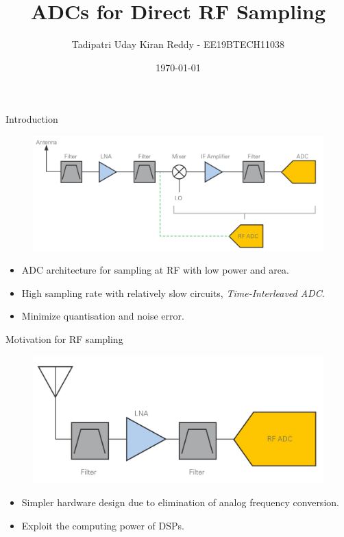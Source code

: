 \documentclass{beamer}
\title[Tadipatri Uday Kiran Reddy]{ADCs for Direct RF Sampling}
\author{Tadipatri Uday Kiran Reddy - EE19BTECH11038}
\institute[]{IIT Hyderabad}
\date{\today}
\begin{document}
\begin{frame}
  \titlepage
\end{frame}

\begin{frame}{Introduction}
\begin{figure}
	\includegraphics[scale=0.2]{./figs/arch.png}
\end{figure}
\pause
\begin{itemize}
	\item ADC architecture for sampling at RF with low power and area.
	\pause
	\item High sampling rate with relatively slow circuits, \textit{Time-Interleaved ADC}.
	\pause
	\item Minimize quantisation and noise error.
\end{itemize}

\end{frame}

\begin{frame}{Motivation for RF sampling}
\begin{figure}
	\includegraphics[scale=0.2]{./figs/rf_arch.png}
\end{figure}
\begin{itemize}
	\item Simpler hardware design due to elimination of analog frequency conversion.
	\pause
	\item Exploit the computing power of DSPs.
\end{itemize}
\end{frame}
\end{document}
